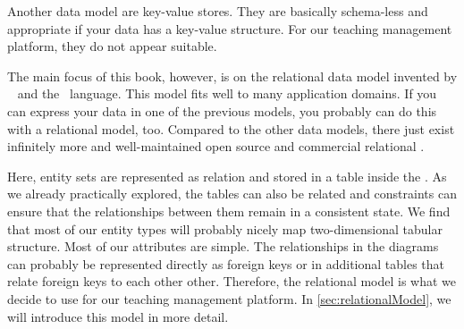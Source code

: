 Another data model are key-value stores.
They are basically schema-less and appropriate if your data has a key-value structure.
For our teaching management platform, they do not appear suitable.

The main focus of this book, however, is on the relational data model invented by \citeauthor{C1970ARMODFLSDB}~\cite{C1970ARMODFLSDB} and the \sql\ language.
This model fits well to many application domains.
If you can express your data in one of the previous models, you probably can do this with a relational model, too.
Compared to the other data models, there just exist infinitely more and well-maintained open source and commercial relational .

Here, entity sets are represented as relation and stored in a table inside the \db.
As we already practically explored, the tables can also be related and constraints can ensure that the relationships between them remain in a consistent state.
We find that most of our entity types will probably nicely map two-dimensional tabular structure.
Most of our attributes are simple.
The relationships in the diagrams can probably be represented directly as foreign keys or in additional tables that relate foreign keys to each other other.
Therefore, the relational model is what we decide to use for our teaching management platform.
In \cref{sec:relationalModel}, we will introduce this model in more detail.%
%
\endhsection%
%
